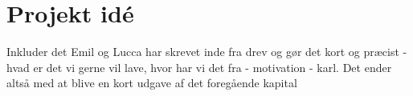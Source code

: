 \section{Projekt idé}
\label{ProjektIde}
%
Inkluder det Emil og Lucca har skrevet inde fra drev og gør det kort og præcist - hvad er det vi gerne vil lave, hvor har vi det fra - motivation - karl. Det ender altså med at blive en kort udgave af det foregående kapital 
